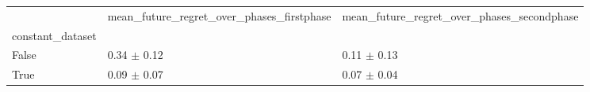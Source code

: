 \begin{tabular}{lll}
\toprule
 & mean_future_regret_over_phases_firstphase & mean_future_regret_over_phases_secondphase \\
constant_dataset &  &  \\
\midrule
False & 0.34 $\pm$ 0.12 & 0.11 $\pm$ 0.13 \\
True & 0.09 $\pm$ 0.07 & 0.07 $\pm$ 0.04 \\
\bottomrule
\end{tabular}
